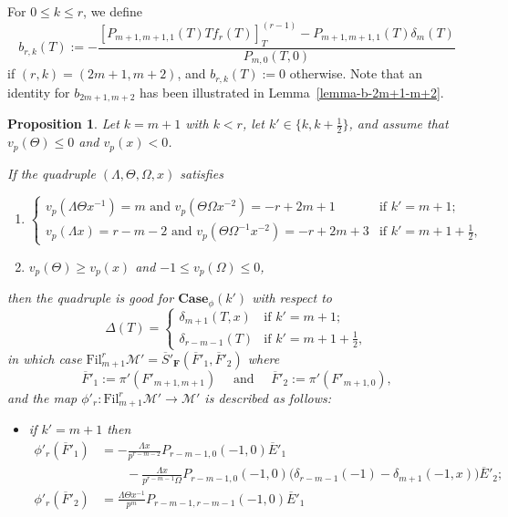\documentclass[11pt]{amsart}
\theoremstyle{definition}
\numberwithin{equation}{subsection}
\theoremstyle{plain}
\theoremstyle{plain}
\theoremstyle{plain}
\theoremstyle{plain}
\theoremstyle{plain}
\theoremstyle{plain}
\theoremstyle{plain}
\theoremstyle{plain}
\newtheorem{prop}[equation]{Proposition}
\theoremstyle{plain}
\theoremstyle{plain}
\theoremstyle{plain}
\theoremstyle{plain}
\theoremstyle{definition}
\theoremstyle{definition}
\theoremstyle{definition}
\theoremstyle{remark}
\renewcommand{\(}{\textup{(}}
\renewcommand{\)}{\textup{)}}
\newcommand{\F}{\mathbf{F}}
\newcommand{\barS}{\overline{S}}
\newcommand{\cM}{\mathcal{M}}
\newcommand{\Fil}{\mathrm{Fil}}
\newcommand{\barE}{\overline{E}}
\newcommand{\barF}{\overline{F}}
\begin{document}
For $0\leq k\leq r$, we define
\begin{equation}\label{eq: definition of b_r,k}
b_{r,k}(T):=-\frac{[P_{m+1,m+1,1}(T)Tf_r(T)]_{T}^{(r-1)} -P_{m+1,m+1,1}(T)\delta_m(T)}{P_{m,0}(T,0)}
\end{equation}
if $(r,k)=(2m+1,m+2)$, and $b_{r,k}(T):=0$ otherwise. Note that an identity for $b_{2m+1,m+2}$ has been illustrated in Lemma~\ref{lemma-b-2m+1-m+2}.

\begin{prop}\label{prop-cM-Case-m+1}
Let $k=m+1$ with $k<r$, let $k'\in\{k,k+\frac{1}{2}\}$, and assume that $v_p(\Theta)\leq0$ and $v_p(x)<0$.

If the quadruple $(\Lambda,\Theta,\Omega,x)$ satisfies
    \begin{enumerate}[leftmargin=*]
      \item $\begin{cases}
          v_p(\Lambda \Theta x^{-1})=m\mbox{ and } v_p(\Theta\Omega x^{-2})=-r+2m+1 & \mbox{if } k'=m+1; \\
          v_p(\Lambda x)=r-m-2\mbox{ and } v_p(\Theta\Omega^{-1} x^{-2})=-r+2m+3 & \mbox{if }k'=m+1+\frac{1}{2},
        \end{cases}$
      \item $v_p(\Theta)\geq v_p(x)$ and 
      $-1\leq v_p(\Omega)\leq 0$,
    \end{enumerate}
    then the quadruple is good for $\mathbf{Case}_\phi(k')$ with respect to
    $$\Delta(T)=
        \begin{cases}
            \delta_{m+1}(T,x) & \mbox{if } k'=m+1; \\
            \delta_{r-m-1}(T) & \mbox{if } k'=m+1+\frac{1}{2},
        \end{cases}$$
in which case $\Fil^r_{m+1}\cM'=\barS'_\F(\barF'_1,\barF'_2)$ where
$$\barF'_1:=\pi'(F'_{m+1,m+1})\quad\mbox{ and }\quad\barF'_2:=\pi'(F'_{m+1,0}),$$
and the map $\phi'_r:\Fil^r_{m+1}\cM'\to \cM'$ is described as follows:
\begin{itemize}[leftmargin=*]
\item if $k'=m+1$ then
    \begin{align*}
    \phi'_r(\barF'_1)&=
        -\frac{\Lambda x}{p^{r-m-2}}P_{r-m-1,0}(-1,0)\barE'_1\\
         &\hspace{2em}
         -\frac{\Lambda x}{p^{r-m-1}\Omega} P_{r-m-1,0}(-1,0)\big(\delta_{r-m-1}(-1)-\delta_{m+1}(-1,x) \big)\barE'_2;\\
    \phi'_r(\barF'_2) &=\frac{\Lambda \Theta x^{-1}}{p^m}P_{r-m-1,r-m-1}(-1,0)\barE'_1\\

\end{align*}
\end{itemize}
\end{prop}
\end{document}
